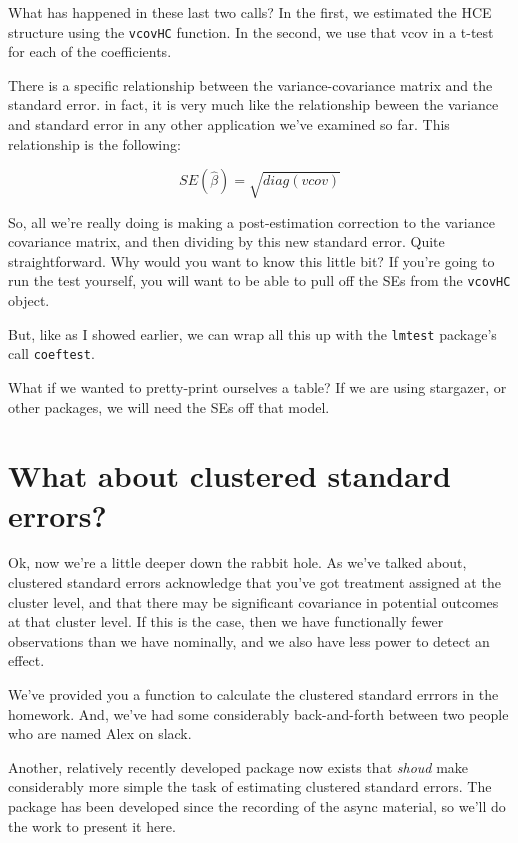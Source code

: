 \documentclass[
]{book}
\begin{document}
What has happened in these last two calls? In the first, we estimated
the HCE structure using the \texttt{vcovHC} function. In the second, we
use that vcov in a t-test for each of the coefficients.

There is a specific relationship between the variance-covariance matrix
and the standard error. in fact, it is very much like the relationship
beween the variance and standard error in any other application we've
examined so far. This relationship is the following:

\[
  SE(\hat{\beta}) = \sqrt{diag(vcov)}
\]

So, all we're really doing is making a post-estimation correction to the
variance covariance matrix, and then dividing by this new standard
error. Quite straightforward. Why would you want to know this little
bit? If you're going to run the test yourself, you will want to be able
to pull off the SEs from the \texttt{vcovHC} object.

But, like as I showed earlier, we can wrap all this up with the
\texttt{lmtest} package's call \texttt{coeftest}.

What if we wanted to pretty-print ourselves a table? If we are using
stargazer, or other packages, we will need the SEs off that model.

\hypertarget{what-about-clustered-standard-errors}{%
\section{What about clustered standard
errors?}\label{what-about-clustered-standard-errors}}

Ok, now we're a little deeper down the rabbit hole. As we've talked
about, clustered standard errors acknowledge that you've got treatment
assigned at the cluster level, and that there may be significant
covariance in potential outcomes at that cluster level. If this is the
case, then we have functionally fewer observations than we have
nominally, and we also have less power to detect an effect.

We've provided you a function to calculate the clustered standard
errrors in the homework. And, we've had some considerably back-and-forth
between two people who are named Alex on slack.

Another, relatively recently developed package now exists that
\emph{shoud} make considerably more simple the task of estimating
clustered standard errors. The package has been developed since the
recording of the async material, so we'll do the work to present it
here.
\end{document}
